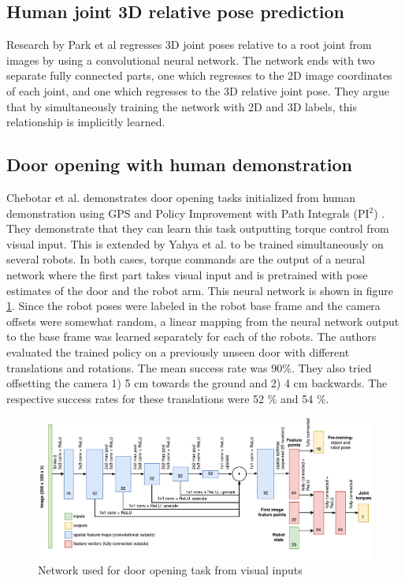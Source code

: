 \subsection{Human joint 3D relative pose prediction}

Research by Park et al \cite{park20163d} regresses 3D joint poses relative to a
root joint from images by using a convolutional neural network. The network
ends with two separate fully connected parts, one which regresses to the 2D
image coordinates of each joint, and one which regresses to the 3D relative
joint pose. They argue that by simultaneously training the network with 2D and
3D labels, this relationship is implicitly learned.


\subsection{Door opening with human demonstration}

Chebotar et al. \cite{chebotar2016path} demonstrates door opening tasks
initialized from human demonstration using GPS and Policy Improvement with Path
Integrals (PI$^2$) \cite{theodorou2010generalized}. They demonstrate that they
can learn this task outputting torque control from visual input. This is
extended by Yahya et al. \cite{yahya2016collective} to be trained
simultaneously on several robots. In both cases, torque commands are the output
of a neural network where the first part takes visual input and is pretrained
with pose estimates of the door and the robot arm. This neural network is shown
in figure \ref{fig:gps_net}. Since the robot poses were labeled in the robot
base frame and the camera offsets were somewhat random, a linear mapping from
the neural network output to the base frame was learned separately for each of
the robots. The authors evaluated the trained policy on a previously unseen
door with different translations and rotations. The mean success rate was 90\%.
They also tried offsetting the camera 1) 5 cm towards the ground and 2) 4 cm
backwards. The respective success rates for these translations were 52 \% and
54 \%.

\begin{figure}[h]
    \centering
    \includegraphics[width = 1.0\textwidth]{res/gps-net.pdf}
    \caption{Network used for door opening task from visual inputs \cite{chebotar2016path}}
    \label{fig:gps_net}
\end{figure}

